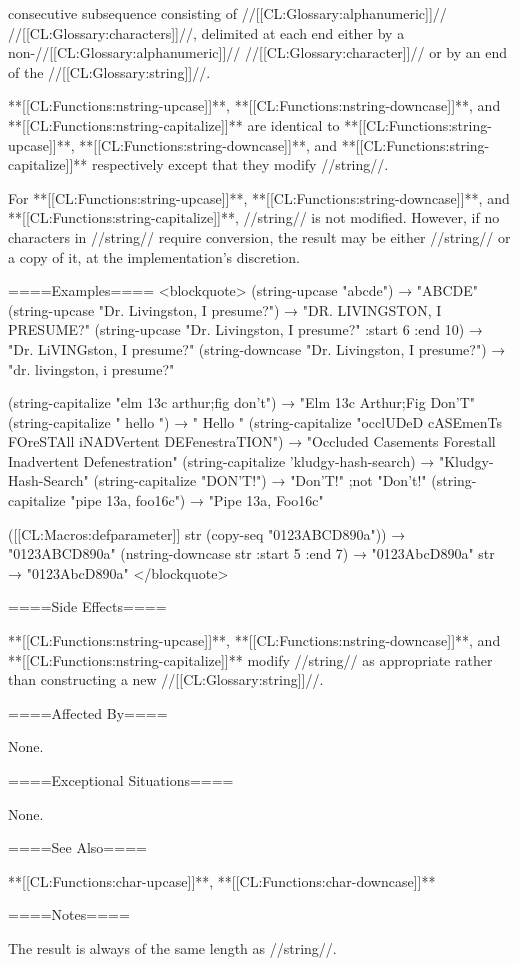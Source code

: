 consecutive subsequence consisting of //[[CL:Glossary:alphanumeric]]// //[[CL:Glossary:characters]]//, delimited at each end either by a non-//[[CL:Glossary:alphanumeric]]// //[[CL:Glossary:character]]// or by an end of the //[[CL:Glossary:string]]//.


**[[CL:Functions:nstring-upcase]]**, **[[CL:Functions:nstring-downcase]]**, and **[[CL:Functions:nstring-capitalize]]** are identical to **[[CL:Functions:string-upcase]]**, **[[CL:Functions:string-downcase]]**, and **[[CL:Functions:string-capitalize]]** respectively except that they modify //string//. \endlist

For **[[CL:Functions:string-upcase]]**, **[[CL:Functions:string-downcase]]**, and **[[CL:Functions:string-capitalize]]**, //string// is not modified. However, if no characters in //string// require conversion, the result may be either //string// or a copy of it, at the implementation's discretion.

====Examples==== <blockquote> (string-upcase "abcde") → "ABCDE" (string-upcase "Dr. Livingston, I presume?") → "DR. LIVINGSTON, I PRESUME?" (string-upcase "Dr. Livingston, I presume?" :start 6 :end 10) → "Dr. LiVINGston, I presume?" (string-downcase "Dr. Livingston, I presume?") → "dr. livingston, i presume?"

(string-capitalize "elm 13c arthur;fig don't") → "Elm 13c Arthur;Fig Don'T" (string-capitalize " hello ") → " Hello " (string-capitalize "occlUDeD cASEmenTs FOreSTAll iNADVertent DEFenestraTION") → "Occluded Casements Forestall Inadvertent Defenestration" (string-capitalize 'kludgy-hash-search) → "Kludgy-Hash-Search" (string-capitalize "DON'T!") → "Don'T!" ;not "Don't!" (string-capitalize "pipe 13a, foo16c") → "Pipe 13a, Foo16c"

([[CL:Macros:defparameter]] str (copy-seq "0123ABCD890a")) → "0123ABCD890a" (nstring-downcase str :start 5 :end 7) → "0123AbcD890a" str → "0123AbcD890a" </blockquote>

====Side Effects====

**[[CL:Functions:nstring-upcase]]**, **[[CL:Functions:nstring-downcase]]**, and **[[CL:Functions:nstring-capitalize]]** modify //string// as appropriate rather than constructing a new //[[CL:Glossary:string]]//.

====Affected By====

None.

====Exceptional Situations====

None.

====See Also====

**[[CL:Functions:char-upcase]]**, **[[CL:Functions:char-downcase]]**

====Notes====

The result is always of the same length as //string//.

  
